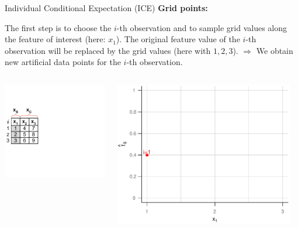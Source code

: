 \documentclass[11pt,compress,t,notes=noshow, xcolor=table]{beamer}
\begin{document}
\begin{vbframe}{Individual Conditional Expectation (ICE)}
\textbf{Grid points:}

The first step is to choose the $i$-th observation and to sample grid values along the feature of interest (here: $x_1$).
The original feature value of the $i$-th observation will be replaced by the grid values (here with $1, 2, 3$). \newline
$\Rightarrow$ We obtain new artificial data points for the $i$-th observation.


\framebreak

\begin{columns}[T]
\begin{column}{0.45\textwidth}
\includegraphics[page=3, trim=0cm 0.35cm 0.85cm 0.35cm, width=\textwidth]{figure_man/ice_plot_demo}
\end{column}
\begin{column}{0.55\textwidth}
\includegraphics[page=1, width=0.95\textwidth]{figure_man/ICE}
\end{column}
\end{columns}
\vspace*{\topsep}


\end{vbframe}
\end{document}
